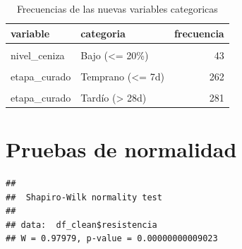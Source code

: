 \documentclass[
]{book}
\newenvironment{Shaded}{\begin{snugshade}}{\end{snugshade}}
\newcommand{\CommentTok}[1]{\textcolor[rgb]{0.56,0.35,0.01}{\textit{#1}}}
\newcommand{\FunctionTok}[1]{\textcolor[rgb]{0.13,0.29,0.53}{\textbf{#1}}}
\newcommand{\NormalTok}[1]{#1}
\newcommand{\SpecialCharTok}[1]{\textcolor[rgb]{0.81,0.36,0.00}{\textbf{#1}}}
\begin{document}
\begin{table}[!h]
\centering
\caption{\label{tab:tabla-nuevas-variables-categoricas}Frecuencias de las nuevas variables categoricas}
\centering
\begin{tabular}[t]{l|l|r}
\hline
variable & categoria & frecuencia\\
\hline
\cellcolor{gray!10}{nivel\_ceniza} & \cellcolor{gray!10}{0\% (Control)} & \cellcolor{gray!10}{566}\\
\hline
nivel\_ceniza & Bajo (<= 20\%) & 43\\
\hline
\cellcolor{gray!10}{nivel\_ceniza} & \cellcolor{gray!10}{Alto (> 20\%)} & \cellcolor{gray!10}{421}\\
\hline
etapa\_curado & Temprano (<= 7d) & 262\\
\hline
\cellcolor{gray!10}{etapa\_curado} & \cellcolor{gray!10}{Estándar (14-28d)} & \cellcolor{gray!10}{487}\\
\hline
etapa\_curado & Tardío (> 28d) & 281\\
\hline
\end{tabular}
\end{table}

\section{Pruebas de normalidad}\label{pruebas-de-normalidad}

\begin{Shaded}
\end{Shaded}

\begin{verbatim}
## 
##  Shapiro-Wilk normality test
## 
## data:  df_clean$resistencia
## W = 0.97979, p-value = 0.00000000009023
\end{verbatim}

\begin{Shaded}
\end{Shaded}
\end{document}
